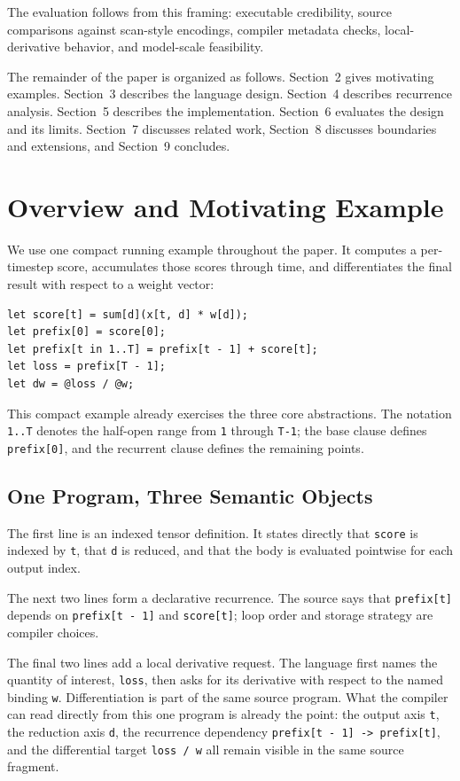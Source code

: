 \documentclass[sigplan,screen,nonacm]{acmart}
\begin{document}
The evaluation follows from this framing: executable credibility, source comparisons against scan-style encodings, compiler metadata checks, local-derivative behavior, and model-scale feasibility.

The remainder of the paper is organized as follows. Section~2 gives motivating examples. Section~3 describes the language design. Section~4 describes recurrence analysis. Section~5 describes the implementation. Section~6 evaluates the design and its limits. Section~7 discusses related work, Section~8 discusses boundaries and extensions, and Section~9 concludes.

\section{Overview and Motivating Example}

We use one compact running example throughout the paper. It computes a per-timestep score, accumulates those scores through time, and differentiates the final result with respect to a weight vector:

\begin{lstlisting}[style=einlang]
let score[t] = sum[d](x[t, d] * w[d]);
let prefix[0] = score[0];
let prefix[t in 1..T] = prefix[t - 1] + score[t];
let loss = prefix[T - 1];
let dw = @loss / @w;
\end{lstlisting}

This compact example already exercises the three core abstractions. The notation \texttt{1..T} denotes the half-open range from \texttt{1} through \texttt{T-1}; the base clause defines \texttt{prefix[0]}, and the recurrent clause defines the remaining points.

\subsection{One Program, Three Semantic Objects}

The first line is an indexed tensor definition. It states directly that \texttt{score} is indexed by \texttt{t}, that \texttt{d} is reduced, and that the body is evaluated pointwise for each output index.

The next two lines form a declarative recurrence. The source says that \texttt{prefix[t]} depends on \texttt{prefix[t - 1]} and \texttt{score[t]}; loop order and storage strategy are compiler choices.

The final two lines add a local derivative request. The language first names the quantity of interest, \texttt{loss}, then asks for its derivative with respect to the named binding \texttt{w}. Differentiation is part of the same source program. What the compiler can read directly from this one program is already the point: the output axis \texttt{t}, the reduction axis \texttt{d}, the recurrence dependency \texttt{prefix[t - 1] -> prefix[t]}, and the differential target \texttt{loss / w} all remain visible in the same source fragment.
\end{document}
